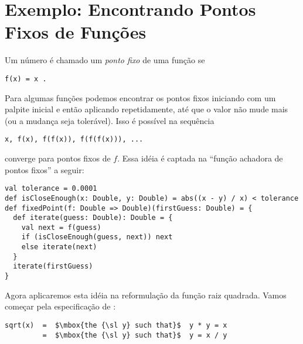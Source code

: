
\section{Exemplo: Encontrando Pontos Fixos de Fun\c{c}\~{o}es}

Um n\'{u}mero  \'{e} chamado um {\em ponto fixo} de uma fun\c{c}\~{a}o  se  
\begin{lstlisting}
f(x) = x .
\end{lstlisting}
Para algumas fun\c{c}\~{o}es  podemos encontrar os pontos fixos iniciando
com um palpite inicial e ent\~{a}o aplicando  repetidamente, at\'{e} que o valor 
n\~{a}o mude mais (ou a mudan\c{c}a seja toler\'{a}vel). Isso \'{e} poss\'{i}vel na sequ\^{e}ncia  
\begin{lstlisting}
x, f(x), f(f(x)), f(f(f(x))), ...
\end{lstlisting}
converge para pontos fixos de $f$. Essa id\'{e}ia \'{e} captada na ``fun\c{c}\~{a}o achadora 
de pontos fixos'' a seguir:
\begin{lstlisting}
val tolerance = 0.0001
def isCloseEnough(x: Double, y: Double) = abs((x - y) / x) < tolerance
def fixedPoint(f: Double => Double)(firstGuess: Double) = {
  def iterate(guess: Double): Double = {
    val next = f(guess)
    if (isCloseEnough(guess, next)) next
    else iterate(next)
  }
  iterate(firstGuess)
}
\end{lstlisting}

Agora aplicaremos esta id\'{e}ia na reformula\c{c}\~{a}o da fun\c{c}\~{a}o raiz quadrada.
Vamos come\c{c}ar pela especifica\c{c}\~{a}o de :  
\begin{lstlisting}
sqrt(x)  =  $\mbox{the {\sl y} such that}$  y * y = x
         =  $\mbox{the {\sl y} such that}$  y = x / y
\end{lstlisting}

